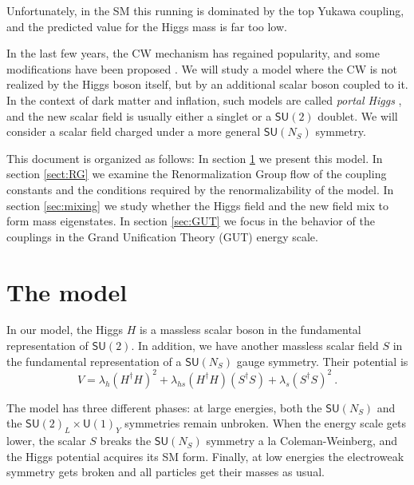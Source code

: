 \documentclass[aps,prd,preprintnumbers,nofootinbibn,twocolumn]{revtex4}
\begin{document}
Unfortunately, in the SM this running is dominated by the top Yukawa coupling, and the predicted value for the Higgs mass is far too low.  

In the last few years, the CW mechanism has regained popularity, and some modifications have been proposed \cite{Dermisek:2013pta, Hill:2014mqa, Antipin:2015kgh}. We will study a model where the CW is not realized by the Higgs boson itself, but by an additional scalar boson coupled to it. In the context of dark matter and inflation, such models are called \textit{portal Higgs} \cite{Patt:2006fw, Englert:2013gz}, and the new scalar field is usually either a singlet or a $\mathsf{SU}(2)$ doublet. We will consider a scalar field charged under a more general $\mathsf{SU}(N_S)$ symmetry.

This document is organized as follows: In section \ref{sect:model} we present this model. In section \ref{sect:RG} we examine the Renormalization Group flow of the coupling constants and the conditions required by the renormalizability of the model. In section \ref{sec:mixing} we study whether the Higgs field and the new field mix to form mass eigenstates. In section \ref{sec:GUT} we focus in the behavior of the couplings in the Grand Unification Theory (GUT) energy scale.

\section{The model} \label{sect:model}
In our model, the Higgs $H$ is a massless scalar boson in the fundamental representation of $\mathsf{SU}(2)$. In addition, we have another massless scalar field $S$ in the fundamental representation of a $\mathsf{SU}(N_S)$ gauge symmetry. Their potential is
\begin{equation}\label{eq:CWpotential}
V = \lambda_h (H^\dagger H)^2 + \lambda_{hs} (H^\dagger H) (S^\dagger S) + \lambda_s (S^\dagger S)^2\ .
\end{equation}

The model has three different phases: at large energies, both the $\mathsf{SU}(N_S)$ and the  $\mathsf{SU}(2)_L \times \mathsf{U}(1)_Y$ symmetries remain unbroken. When the energy scale gets lower, the scalar $S$ breaks the $\mathsf{SU}(N_S)$ symmetry a la Coleman-Weinberg, and the Higgs potential acquires its SM form. Finally, at low energies the electroweak symmetry gets broken and all particles get their masses as usual.
\end{document}

